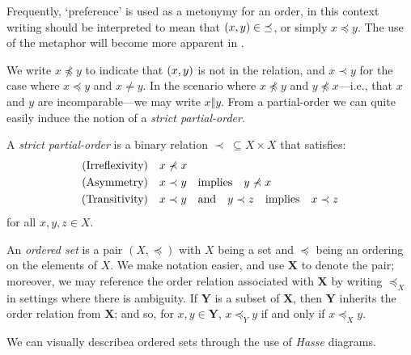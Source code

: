 Frequently, `preference' is used as a metonymy for an order, in this context writing  should be interpreted to mean that $(x,y)\in \; \preceq$, or simply
$x \preceq y$. The use of the metaphor will become more apparent in .

We write $x \npreceq y$ to indicate that $(x,y)$ is not in the relation, and $x \prec y$ for the case where $x\preceq y$ and $x \not = y$. In the scenario where $x \not \preceq y$ and $y \not \preceq
x$---i.e., that $x$ and $y$ are incomparable---we may write $x \Vert y$. From a partial-order we can quite easily induce the notion of a \emph{strict partial-order}.

\begin{definition}
  \label{definition:strict-partial-order} A \textit{strict partial-order}  is a binary relation $\prec \; \subseteq X \times X$ that satisfies:
  \begin{align}
    \text{(Irreflexivity)}\quad & x \nprec x                                 \\
    \text{(Asymmetry)}\quad     & x \prec y \quad \text{implies} \quad y \nprec x                \\
    \text{(Transitivity)}\quad  & x \prec y \quad \text{and} \quad y \prec z \quad \text{implies} \quad x \prec z
  \end{align}
  for all $x,y,z \in X$.
\end{definition}

An \textit{ordered set} is a pair $(X, \preceq)$ with $X$ being a set and $\preceq$ being an ordering on the elements of $X$. We make notation easier, and use $\mathbf{X}$ to denote the pair; moreover,
we may reference the order relation associated with $\mathbf{X}$ by writing $\preceq_{X}$ in settings where there is ambiguity. If $\mathbf{Y}$ is a subset of $\mathbf{X}$, then $\mathbf{Y}$ inherits the
order relation from $\mathbf{X}$; and so, for $x,y \in \mathbf{Y}$, $x \preceq_{Y}y$ if and only if $x \preceq_{X}y$. 

We can visually describea ordered sets through the use of \textit{Hasse} diagrams.

